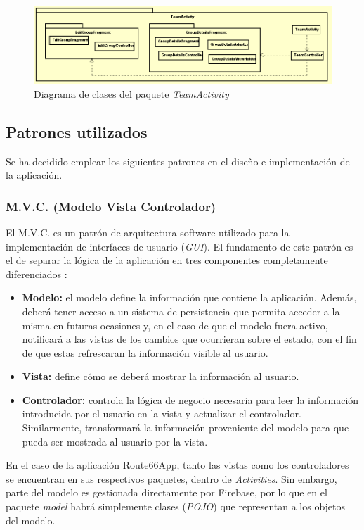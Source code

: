 \documentclass[twoside]{report}
\begin{document}
\begin{figure}[H]
\centering
\includegraphics[scale=0.6]{images/structureTeam}
\caption{Diagrama de clases del paquete \textit{TeamActivity}}
\end{figure}

\subsection{Patrones utilizados}
Se ha decidido emplear los siguientes patrones en el diseño e implementación de la aplicación.

\subsubsection{M.V.C. (Modelo Vista Controlador)}
El M.V.C. es un patrón de arquitectura software utilizado para la implementación de interfaces de usuario (\textit{GUI}). El fundamento de este patrón es el de separar la lógica de la aplicación en tres componentes completamente diferenciados \cite{mvcua}:
\begin{itemize}
\item \textbf{Modelo:} el modelo define la información que contiene la aplicación. Además, deberá tener acceso a un sistema de persistencia que permita acceder a la misma en futuras ocasiones y, en el caso de que el modelo fuera activo, notificará a las vistas de los cambios que ocurrieran sobre el estado, con el fin de que estas refrescaran la información visible al usuario.
\item \textbf{Vista:} define cómo se deberá mostrar la información al usuario.
\item \textbf{Controlador:} controla la lógica de negocio necesaria para leer la información introducida por el usuario en la vista y actualizar el controlador. Similarmente, transformará la información proveniente del modelo para que pueda ser mostrada al usuario por la vista.
\end{itemize}
En el caso de la aplicación Route66App, tanto las vistas como los controladores se encuentran en sus respectivos paquetes, dentro de \textit{Activities}. Sin embargo, parte del modelo es gestionada directamente por Firebase, por lo que en el paquete \textit{model} habrá simplemente clases (\textit{POJO}) que representan a los objetos del modelo.
\end{document}
